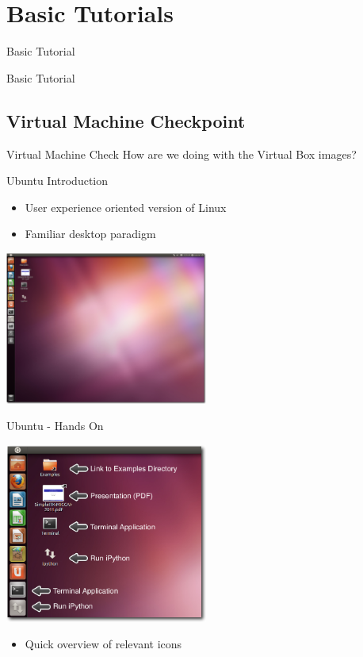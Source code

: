 \section{Basic Tutorials}
\begin{frame}{Basic Tutorial}
\fontsize{36pt}{36pt}\selectfont
\center
\begin{center}
Basic Tutorial
\end{center}
\end{frame}

\subsection{Virtual Machine Checkpoint}
\begin{frame}{Virtual Machine Check}
How are we doing with the Virtual Box images?
\end{frame}

\begin{frame}{Ubuntu Introduction}
\begin{itemize}
  \item User experience oriented version of Linux
  \item Familiar desktop paradigm
\end{itemize}
\begin{center}
  \includegraphics[width=0.5\textwidth]{Images/UbuntuDesktop_shadow}
\end{center}
\end{frame}

\begin{frame}{Ubuntu - Hands On  }
\begin{center}
  \includegraphics[width=0.5\textwidth]{Images/UbuntuDesktopExplanation_shadow}
\end{center}
\begin{itemize}
  \item Quick overview of relevant icons
\end{itemize}
\end{frame}

